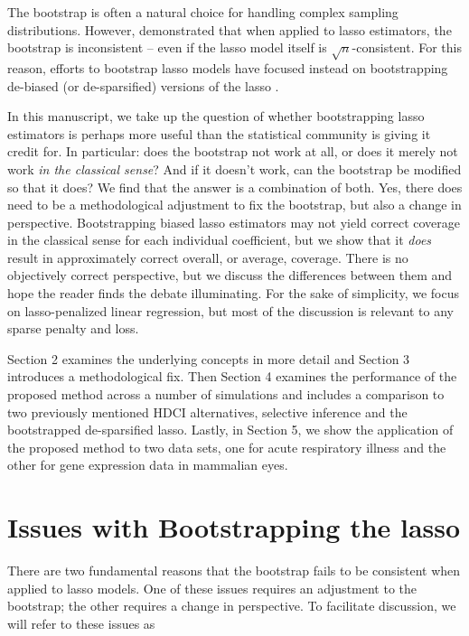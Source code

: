 The bootstrap is often a natural choice for handling complex sampling distributions. However, \cite{Chatterjee2010} demonstrated that when applied to lasso estimators, the bootstrap is inconsistent -- even if the lasso model itself is $\sqrt{n}$-consistent. For this reason, efforts to bootstrap lasso models have focused instead on bootstrapping de-biased (or de-sparsified) versions of the lasso \citep{Dezeure2017}.

In this manuscript, we take up the question of whether bootstrapping lasso estimators is perhaps more useful than the statistical community is giving it credit for. In particular: does the bootstrap not work at all, or does it merely not work \emph{in the classical sense}? And if it doesn't work, can the bootstrap be modified so that it does? We find that the answer is a combination of both. Yes, there does need to be a methodological adjustment to fix the bootstrap, but also a change in perspective. Bootstrapping biased lasso estimators may not yield correct coverage in the classical sense for each individual coefficient, but we show that it \emph{does} result in approximately correct overall, or average, coverage. There is no objectively correct perspective, but we discuss the differences between them and hope the reader finds the debate illuminating. For the sake of simplicity, we focus on lasso-penalized linear regression, but most of the discussion is relevant to any sparse penalty and loss.

Section 2 examines the underlying concepts in more detail and Section 3 introduces a methodological fix. Then Section 4 examines the performance of the proposed method across a number of simulations and includes a comparison to two previously mentioned HDCI alternatives, selective inference and the bootstrapped de-sparsified lasso. Lastly, in Section 5, we show the application of the proposed method to two data sets, one for acute respiratory illness and the other for gene expression data in mammalian eyes.

\section{Issues with Bootstrapping the lasso}
\label{Sec:Difficulties}

There are two fundamental reasons that the bootstrap fails to be consistent when applied to lasso models. One of these issues requires an adjustment to the bootstrap; the other requires a change in perspective. To facilitate discussion, we will refer to these issues as

